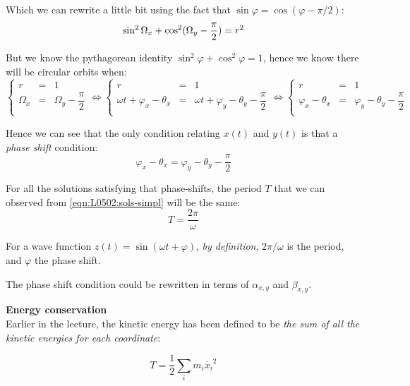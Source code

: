 \documentclass[solutions.tex]{subfiles}
\begin{document}
Which we can rewrite a little bit using the fact that
$\sin\varphi = \cos(\varphi-\pi/2)$:
\[
	\sin^2\Omega_x+\cos^2(\Omega_y-\frac{\pi}{2}) = r^2 \\
\]

But we know the pythagorean identity $\sin^2\varphi+\cos^2\varphi = 1$,
hence we know there will be circular orbits when:
\begin{equation*}
	\left\{
	\begin{array}{lll}
		r &=& 1 \\
		\Omega_x &=& \Omega_y - \dfrac{\pi}{2} \\
	\end{array}
	\right.
	\Leftrightarrow
	\left\{
	\begin{array}{lll}
		r &=& 1 \\
		\omega t + \varphi_x - \theta_x &=& \omega t + \varphi_y -\theta_y - \dfrac{\pi}{2} \\
	\end{array}
	\right.
	\Leftrightarrow
	\left\{
	\begin{array}{lll}
		r &=& 1 \\
		\varphi_x - \theta_x &=& \varphi_y -\theta_y - \dfrac{\pi}{2} \\
	\end{array}
	\right.
\end{equation*}

Hence we can see that the only condition relating $x(t)$ and $y(t)$ is that
a \textit{phase shift} condition:
\[
	\boxed{\varphi_x - \theta_x = \varphi_y -\theta_y - \dfrac{\pi}{2}}
\]

For all the solutions satisfying that phase-shifts, the period $T$ that
we can observed from \eqref{eqn:L0502:sols-simpl} will be the same:
\[
	\boxed{T=\dfrac{2\pi}{\omega}}
\]

\begin{remark} For a wave function $z(t)=\sin(\omega t+\varphi)$,
\textit{by definition}, $2\pi/\omega$ is the period, and $\varphi$
the phase shift.
\end{remark}
\begin{remark} The phase shift condition could be rewritten in terms
of $\alpha_{x,y}$ and $\beta_{x,y}$.
\end{remark}

\hr
\textbf{Energy conservation}\ \\
Earlier in the lecture, the kinetic energy has been defined to be
\textit{the sum of all the kinetic energies for each coordinate}:

\begin{equation}
	T=\frac12\sum_i m_i \dot{x_i}^2
\end{equation}
\end{document}
